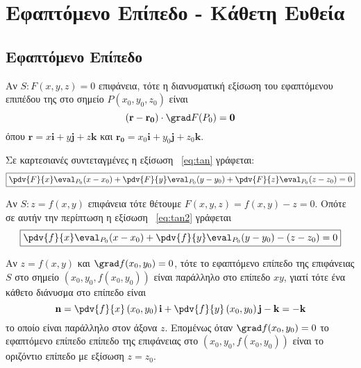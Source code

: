 


\geometry{top=1cm}

\pagestyle{vangelis}
\everymath{\displaystyle}
\setcounter{chapter}{1}




\chapter*{Εφαπτόμενο Επίπεδο - Κάθετη Ευθεία}

\section*{Εφαπτόμενο Επίπεδο}


\begin{myitemize}
  \item Αν $S: F(x,y,z)=0$ επιφάνεια, τότε η διανυσματική εξίσωση του 
    εφαπτόμενου επιπέδου της στο σημείο $ P(x_{0}, y_{0}, z_{0}) $ είναι
    \begin{equation}\label{eq:tan}
      (\mathbf{r} - \mathbf{r_{0}})\cdot \grad F(P_{0})= \mathbf{0} 
    \end{equation} 
    όπου $ \mathbf{r}=x \mathbf{i}+y \mathbf{j}+z \mathbf{k} $ και 
    $ \mathbf{r_{0}}=x_{0} \mathbf{i}+ y _{0} \mathbf{j}+ z_{0} \mathbf{k} $.

    Σε καρτεσιανές συντεταγμένες η εξίσωση ~\eqref{eq:tan} γράφεται:
    \begin{equation}\label{eq:tan2}
      \boxed{		
        \pdv{F}{x}\eval_{P_{0}} (x-x_{0}) + \pdv{F}{y}\eval_{P_{0}} (y-y_{0}) +
        \pdv{F}{z}\eval_{P_{0}} (z-z_{0}) =0 
      } 
    \end{equation}

  \item Αν $ S: z=f(x,y) $ επιφάνεια τότε θέτουμε $ F(x,y,z) =  f(x,y) - z = 0 $. 
    Οπότε σε αυτήν την περίπτωση η εξίσωση ~\eqref{eq:tan2} γράφεται
    \[
      \boxed{
        \pdv{f}{x}\eval_{P_{0}} (x - x_{0}) + 
        \pdv{f}{y}\eval_{P_{0}} (y - y_{0}) - (z - z_{0}) = 0 
      }
    \] 
\end{myitemize}

\begin{rem}
  Αν $ z=f(x,y) $ και $ \grad f(x_{0}, y_{0}) = 0 $, τότε το εφαπτόμενο επίπεδο 
  της επιφάνειας $S$ στο σημείο $ (x_{0}, y_{0}, f(x_{0}, y_{0})) $ είναι 
  παράλληλο στο επίπεδο $ xy $, γιατί τότε ένα κάθετο διάνυσμα στο επίπεδο είναι 
  \[
    \mathbf{n} = \pdv{f}{x} \left(x_{0}, y_{0}\right)  \mathbf{i} + 
    \pdv{f}{y} \left(x_{0}, y_{0}\right) \mathbf{j} - \mathbf{k} = - \mathbf{k}
  \] 
  το οποίο είναι παράλληλο στον άξονα $z$. Επομένως όταν 
  $ \grad f(x_{0}, y_{0}) = 0 $ το εφαπτόμενο επίπεδο επίπεδο της επιφάνειας στο 
  $ (x_{0}, y_{0}, f(x_{0}, y_{0})) $ είναι το οριζόντιο επίπεδο με εξίσωση 
  $ z = z_{0} $.
\end{rem}

